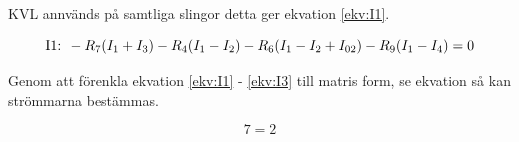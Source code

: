 \documentclass[a4paper,12pt]{article}
\begin{document}
KVL annvänds på samtliga slingor detta ger ekvation \ref{ekv:I1}.

\begin{equation}
\text{I1: }-R_7(I_1+I_3)-R_4(I_1-I_2)-R_6(I_1-I_2+I_{02})-R_9(I_1-I_4)=0 \\
\label{ekv:KVLrough}
\end{equation}

Genom att förenkla ekvation \ref{ekv:I1} - \ref{ekv:I3} till matris form, se ekvation så kan strömmarna bestämmas.

\begin{equation}
7=2
\label{ekv:KVLmatrix}
\end{equation}
\end{document}
